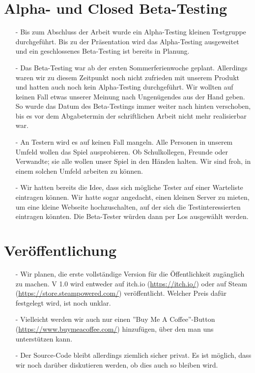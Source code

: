 \section{Alpha- und Closed Beta-Testing}
\begin{itemize}
    \item[-] Bis zum Abschluss der Arbeit wurde ein Alpha-Testing kleinen Testgruppe durchgeführt. Bis zu der Präsentation wird
    das Alpha-Testing ausgeweitet und ein geschlossenes Beta-Testing ist bereits in Planung. 
    \item[-] Das Beta-Testing war ab der ersten Sommerferienwoche geplant. Allerdings waren wir zu diesem Zeitpunkt noch nicht zufrieden mit unserem Produkt und hatten auch noch kein Alpha-Testing durchgeführt. Wir wollten
    auf keinen Fall etwas unserer Meinung nach Ungenügendes aus der Hand geben. So wurde das Datum des Beta-Testings immer weiter nach hinten verschoben, bis es vor dem Abgabetermin der schriftlichen Arbeit nicht mehr realisierbar war.
    \item[-] An Testern wird es auf keinen Fall mangeln. Alle Personen in unserem Umfeld wollen
    das Spiel ausprobieren. Ob Schulkollegen, Freunde oder Verwandte; sie alle wollen unser Spiel in den Händen halten. Wir sind froh, in einem solchen Umfeld arbeiten zu können.
    \item[-] Wir hatten bereits die Idee, dass sich mögliche Tester auf einer Warteliste eintragen können. Wir hatte sogar angedacht, einen kleinen Server zu mieten,
    um eine kleine Webseite hochzuschalten, auf der sich die Testinteressierten eintragen könnten. Die Beta-Tester würden dann per Los ausgewählt werden.
\end{itemize}

\section{Veröffentlichung}
\begin{itemize}
    \item[-] Wir planen, die erste vollständige Version für die Öffentlichkeit zugänglich zu machen. V 1.0 wird entweder auf itch.io (\url{https://itch.io/}) oder auf Steam 
    (\url{https://store.steampowered.com/}) veröffentlicht. Welcher Preis dafür festgelegt wird, ist noch unklar.
    \item[-] Vielleicht werden wir auch nur einen ''Buy Me A Coffee''-Button (\url{https://www.buymeacoffee.com/}) hinzufügen, über den man uns unterstützen kann. 
    \item[-] Der Source-Code bleibt allerdings ziemlich sicher privat. Es ist möglich, dass wir noch darüber diskutieren werden, ob dies auch so bleiben wird.
\end{itemize}



